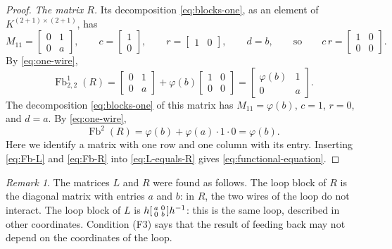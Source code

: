 \documentclass[11pt,a4paper]{article}
\theoremstyle{plain}
\theoremstyle{definition}
\theoremstyle{remark}
\newtheorem{remark}[theorem]{Remark}
\DeclareMathOperator{\Fb}{Fb}
\begin{document}
\begin{proof}
    \emph{The matrix $R$.}
    Its decomposition \cref{eq:blocks-one}, as an element of $K^{(2+1) \times (2+1)}$, has
    \begin{equation*}
        M_{11} = \begin{bmatrix} 0 & 1 \\ 0 & a \end{bmatrix},
        \qquad
        c = \begin{bmatrix} 1 \\ 0 \end{bmatrix},
        \qquad
        r = \begin{bmatrix} 1 & 0 \end{bmatrix},
        \qquad
        d = b,
        \qquad \text{so} \qquad
        c\, r = \begin{bmatrix} 1 & 0 \\ 0 & 0 \end{bmatrix} .
    \end{equation*}
    By \cref{eq:one-wire},
    \begin{equation*}
        \Fb^1_{2,2}(R) = \begin{bmatrix} 0 & 1 \\ 0 & a \end{bmatrix} + \varphi(b) \begin{bmatrix} 1 & 0 \\ 0 & 0 \end{bmatrix}
        = \begin{bmatrix} \varphi(b) & 1 \\ 0 & a \end{bmatrix} .
    \end{equation*}
    The decomposition \cref{eq:blocks-one} of this matrix has $M_{11} = \varphi(b)$, $c = 1$, $r = 0$, and $d = a$.
    By \cref{eq:one-wire},
    \begin{equation}
        \label{eq:Fb-R}
        \Fb^2(R) = \varphi(b) + \varphi(a) \cdot 1 \cdot 0 = \varphi(b) .
    \end{equation}
    Here we identify a matrix with one row and one column with its entry.
    Inserting \cref{eq:Fb-L} and \cref{eq:Fb-R} into \cref{eq:L-equals-R} gives \cref{eq:functional-equation}.
\end{proof}

\begin{remark}
    \label{rem:conjugation}
    The matrices $L$ and $R$ were found as follows.
    The loop block of $R$ is the diagonal matrix with entries $a$ and $b$: in $R$, the two wires of the loop do not interact.
    The loop block of $L$ is $h \begin{bsmallmatrix} a & 0 \\ 0 & b \end{bsmallmatrix} h^{-1}$: this is the same loop, described in other coordinates.
    Condition (F3) says that the result of feeding back may not depend on the coordinates of the loop.
\end{remark}
\end{document}
